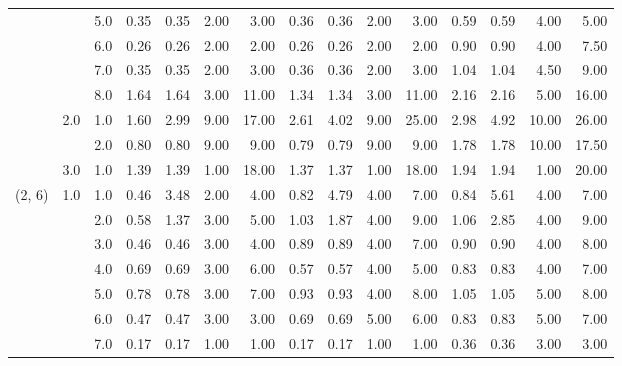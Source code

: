 \begin{tabular}{lllrrrrrrrrrrrr}
       &     & 5.0  &       0.35 &      0.35 & 2.00 &   3.00 &       0.36 &      0.36 &  2.00 &   3.00 &       0.59 &      0.59 &  4.00 &   5.00 \\
       &     & 6.0  &       0.26 &      0.26 & 2.00 &   2.00 &       0.26 &      0.26 &  2.00 &   2.00 &       0.90 &      0.90 &  4.00 &   7.50 \\
       &     & 7.0  &       0.35 &      0.35 & 2.00 &   3.00 &       0.36 &      0.36 &  2.00 &   3.00 &       1.04 &      1.04 &  4.50 &   9.00 \\
       &     & 8.0  &       1.64 &      1.64 & 3.00 &  11.00 &       1.34 &      1.34 &  3.00 &  11.00 &       2.16 &      2.16 &  5.00 &  16.00 \\
       & 2.0 & 1.0  &       1.60 &      2.99 & 9.00 &  17.00 &       2.61 &      4.02 &  9.00 &  25.00 &       2.98 &      4.92 & 10.00 &  26.00 \\
       &     & 2.0  &       0.80 &      0.80 & 9.00 &   9.00 &       0.79 &      0.79 &  9.00 &   9.00 &       1.78 &      1.78 & 10.00 &  17.50 \\
       & 3.0 & 1.0  &       1.39 &      1.39 & 1.00 &  18.00 &       1.37 &      1.37 &  1.00 &  18.00 &       1.94 &      1.94 &  1.00 &  20.00 \\
(2, 6) & 1.0 & 1.0  &       0.46 &      3.48 & 2.00 &   4.00 &       0.82 &      4.79 &  4.00 &   7.00 &       0.84 &      5.61 &  4.00 &   7.00 \\
       &     & 2.0  &       0.58 &      1.37 & 3.00 &   5.00 &       1.03 &      1.87 &  4.00 &   9.00 &       1.06 &      2.85 &  4.00 &   9.00 \\
       &     & 3.0  &       0.46 &      0.46 & 3.00 &   4.00 &       0.89 &      0.89 &  4.00 &   7.00 &       0.90 &      0.90 &  4.00 &   8.00 \\
       &     & 4.0  &       0.69 &      0.69 & 3.00 &   6.00 &       0.57 &      0.57 &  4.00 &   5.00 &       0.83 &      0.83 &  4.00 &   7.00 \\
       &     & 5.0  &       0.78 &      0.78 & 3.00 &   7.00 &       0.93 &      0.93 &  4.00 &   8.00 &       1.05 &      1.05 &  5.00 &   8.00 \\
       &     & 6.0  &       0.47 &      0.47 & 3.00 &   3.00 &       0.69 &      0.69 &  5.00 &   6.00 &       0.83 &      0.83 &  5.00 &   7.00 \\
       &     & 7.0  &       0.17 &      0.17 & 1.00 &   1.00 &       0.17 &      0.17 &  1.00 &   1.00 &       0.36 &      0.36 &  3.00 &   3.00 \\

\end{tabular}
